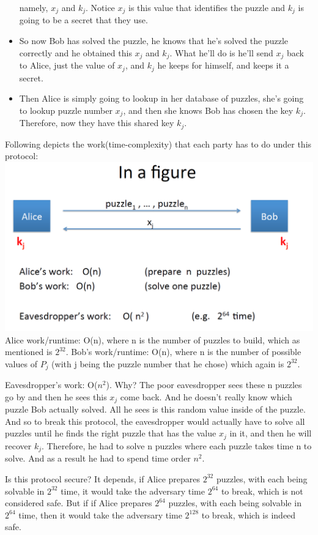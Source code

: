 \documentclass[11pt]{article}
\makeatletter
\def\maxwidth{\ifdim\Gin@nat@width>\linewidth\linewidth
    \else\Gin@nat@width\fi}
\let\Oldincludegraphics\includegraphics
\renewcommand{\includegraphics}[1]{\Oldincludegraphics[width=.8\maxwidth]{#1}}
\makeatother
\begin{document}
\begin{itemize}
  namely, \(x_{j}\) and \(k_{j}\). Notice \(x_{j}\) is this value that
  identifies the puzzle and \(k_{j}\) is going to be a secret that they
  use. 
\item
  So now Bob has solved the puzzle, he knows that he's solved the puzzle
  correctly and he obtained this \(x_{j}\) and \(k_{j}\). What he'll do
  is he'll send \(x_{j}\) back to Alice, just the value of \(x_{j}\),
  and \(k_{j}\) he keeps for himself, and keeps it a secret. 
\item
  Then Alice is simply going to lookup in her database of puzzles, she's
  going to lookup puzzle number \(x_{j}\), and then she knows Bob has
  chosen the key \(k_{j}\). Therefore, now they have this shared key
  \(k_{j}\).
\end{itemize}

Following depicts the work(time-complexity) that each party has to do
under this protocol: \includegraphics{./Images/MP-Work.png} Alice
work/runtime: O(n), where n is the number of puzzles to build, which as
mentioned is \(2^{32}\). Bob's work/runtime: O(n), where n is the number
of possible values of \(P_{j}\) (with j being the puzzle number that he
chose) which again is \(2^{32}\).

Eavesdropper's work: O(\(n^{2}\)). Why? The poor eavesdropper sees these
n puzzles go by and then he sees this \(x_{j}\) come back. And he
doesn't really know which puzzle Bob actually solved. All he sees is
this random value inside of the puzzle. And so to break this protocol,
the eavesdropper would actually have to solve all puzzles until he finds
the right puzzle that has the value \(x_{j}\) in it, and then he will
recover \(k_{j}\). Therefore, he had to solve n puzzles where each
puzzle takes time n to solve. And as a result he had to spend time order
\(n^{2}\).

Is this protocol secure? It depends, if Alice prepares \(2^{32}\)
puzzles, with each being solvable in \(2^{32}\) time, it would take the
adversary time \(2^{64}\) to break, which is not considered safe. But if
if Alice prepares \(2^{64}\) puzzles, with each being solvable in
\(2^{64}\) time, then it would take the adversary time \(2^{128}\) to
break, which is indeed safe.
\end{document}
